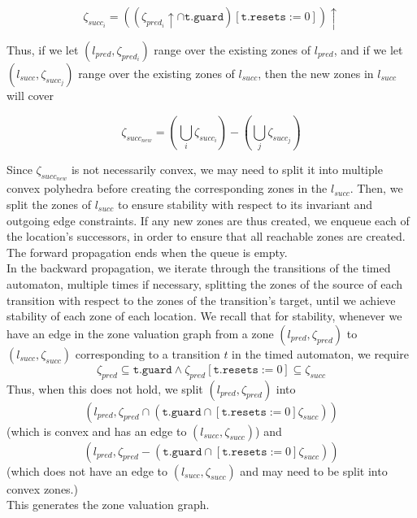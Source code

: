 \documentclass[a4paper]{llncs}
\begin{document}
\begin{displaymath} 
  \zeta _{succ_{i}} = ((\zeta _{pred_{i}} \uparrow \cap \texttt{t.guard})[\texttt{t.resets} := 0]) \uparrow
\end{displaymath} 

Thus, if we let  $(l_{pred}, \zeta _{pred_{i}})$ range over the
existing zones of $l_{pred}$, and if we let  $(l_{succ}, \zeta
_{succ_{j}})$ range over the existing zones of $l_{succ}$, then the
new zones in $l_{succ}$ will cover

\begin{displaymath} 
  \zeta _{succ_{new}} = (\bigcup _{i} \zeta_{succ_{i}}) - (\bigcup _{j} \zeta_{succ_{j}})
\end{displaymath} 

Since $\zeta _{succ_{new}}$ is not necessarily convex, we may need to
split it into multiple convex polyhedra before creating the
corresponding zones in the $l_{succ}$. Then, we split the zones of
$l_{succ}$ to ensure stability with respect to
its invariant and outgoing edge constraints. If any new
zones are thus created, we enqueue each of the location's successors,
in order to ensure that all reachable zones are created. The forward
propagation ends when the queue is empty. \\

In the backward propagation, we
iterate through the transitions of the timed automaton, multiple times
if necessary, splitting the zones of the source of each transition
with respect to the zones of the transition's target, until we achieve
stability of each zone of each location. We recall that for stability,
whenever we have an edge in the zone valuation graph from a zone
$(l_{pred}, \zeta _{pred})$ to $(l_{succ}, \zeta _{succ})$
corresponding to a transition $t$ in the timed automaton, we require 
\begin{displaymath} 
  \zeta _{pred} \subseteq \texttt{t.guard}
  \wedge
  \zeta _{pred} [\texttt{t.resets} := 0] \subseteq \zeta _{succ}
\end{displaymath} 
Thus, when this does not hold, we split $(l_{pred}, \zeta _{pred})$
into
\begin{displaymath} 
  (l_{pred}, \zeta _{pred} \cap (\texttt{t.guard} \cap [\texttt{t.resets} := 0] \zeta _{succ}))
\end{displaymath} 
(which is convex and has an edge to $(l_{succ}, \zeta _{succ})$)
and
\begin{displaymath} 
  (l_{pred}, \zeta _{pred} - (\texttt{t.guard} \cap [\texttt{t.resets} := 0] \zeta _{succ}))
\end{displaymath} 
(which does not have an edge to $(l_{succ}, \zeta _{succ})$ and may
need to be split into convex zones.) \\
This generates the zone valuation graph.
\end{document}
